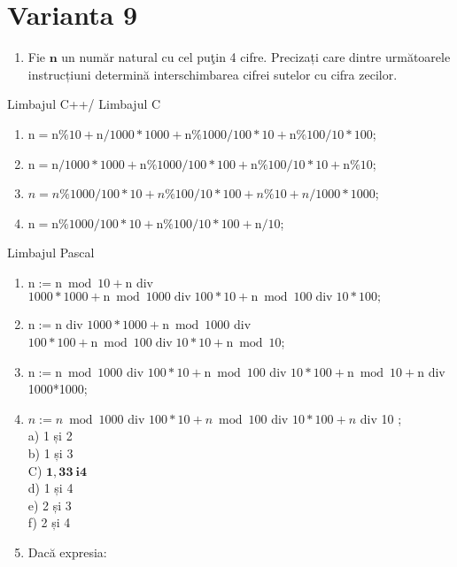 \section*{Varianta 9}
\begin{enumerate}
  \item Fie $\mathbf{n}$ un număr natural cu cel puţin 4 cifre. Precizați care dintre următoarele instrucțiuni determină interschimbarea cifrei sutelor cu cifra zecilor.
\end{enumerate}

Limbajul C++/ Limbajul C

\begin{enumerate}
  \item $\mathrm{n}=\mathrm{n} \% 10+\mathrm{n} / 1000 * 1000+\mathrm{n} \% 1000 / 100 * 10+\mathrm{n} \% 100 / 10 * 100$;
  \item $\mathrm{n}=\mathrm{n} / 1000 * 1000+\mathrm{n} \% 1000 / 100 * 100+\mathrm{n} \% 100 / 10 * 10+\mathrm{n} \% 10$;
  \item $n=n \% 1000 / 100 * 10+n \% 100 / 10 * 100+n \% 10+n / 1000 * 1000$;
  \item $\mathrm{n}=\mathrm{n} \% 1000 / 100 * 10+\mathrm{n} \% 100 / 10 * 100+\mathrm{n} / 10$;
\end{enumerate}

Limbajul Pascal

\begin{enumerate}
  \item $\mathrm{n}:=\mathrm{n} \bmod 10+\mathrm{n}$ div $1000 * 1000+\mathrm{n} \bmod 1000 \operatorname{div} 100 * 10+\mathrm{n} \bmod 100 \operatorname{div} 10 * 100 ;$
  \item $\mathrm{n}:=\mathrm{n}$ div $1000 * 1000+\mathrm{n} \bmod 1000$ div $100 * 100+\mathrm{n} \bmod 100 \operatorname{div} 10 * 10+\mathrm{n} \bmod 10$;
  \item $\mathrm{n}:=\mathrm{n} \bmod 1000$ div $100 * 10+\mathrm{n} \bmod 100$ div $10 * 100+\mathrm{n} \bmod 10+\mathrm{n}$ div 1000*1000;
  \item $n:=n \bmod 1000$ div $100 * 10+n \bmod 100$ div $10 * 100+n$ div 10 ;\\
a) 1 și 2\\
b) 1 și 3\\
C) $\mathbf{1 , 3} \mathbf{3} \mathbf{~ i} \mathbf{4}$\\
d) 1 și 4\\
e) 2 și 3\\
f) 2 și 4
  \item Dacă expresia:
\end{enumerate}

